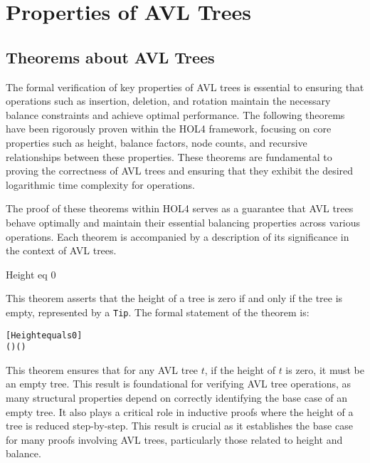 \chapter{Properties of AVL Trees}\label{chap:content}


\section{Theorems about AVL Trees}

The formal verification of key properties of AVL trees is essential to ensuring that operations such as insertion, deletion, and rotation maintain the necessary balance constraints and achieve optimal performance. The following theorems have been rigorously proven within the HOL4 framework, focusing on core properties such as height, balance factors, node counts, and recursive relationships between these properties. These theorems are fundamental to proving the correctness of AVL trees and ensuring that they exhibit the desired logarithmic time complexity for operations.

The proof of these theorems within HOL4 serves as a guarantee that AVL trees behave optimally and maintain their essential balancing properties across various operations. Each theorem is accompanied by a description of its significance in the context of AVL trees.

	
	\begin{thm}{Height eq 0}

    This theorem asserts that the height of a tree is zero if and only if the tree is empty, represented by a \texttt{Tip}. The formal statement of the theorem is:

    \begin{alltt}
    	[Height equals 0]
    	\HOLTokenTurnstile{} (  \HOLSymConst{=}  \HOLSymConst{\HOLTokenEquiv{}}  \HOLSymConst{=} ) \HOLSymConst{\HOLTokenConj{}} ( \HOLSymConst{=}   \HOLSymConst{\HOLTokenEquiv{}}  \HOLSymConst{=} )
    \end{alltt}
    
    
    \end{thm}

    This theorem ensures that for any AVL tree \(t\), if the height of \(t\) is zero, it must be an empty tree. This result is foundational for verifying AVL tree operations, as many structural properties depend on correctly identifying the base case of an empty tree. It also plays a critical role in inductive proofs where the height of a tree is reduced step-by-step. This result is crucial as it establishes the base case for many proofs involving AVL trees, particularly those related to height and balance.

